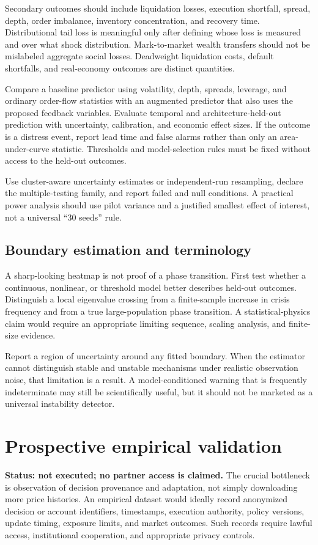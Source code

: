 \documentclass[11pt,a4paper]{article}
\theoremstyle{definition}
\theoremstyle{remark}
\begin{document}
Secondary outcomes should include liquidation losses, execution shortfall, spread, depth, order imbalance, inventory concentration, and recovery time. Distributional tail loss is meaningful only after defining whose loss is measured and over what shock distribution. Mark-to-market wealth transfers should not be mislabeled aggregate social losses. Deadweight liquidation costs, default shortfalls, and real-economy outcomes are distinct quantities.

Compare a baseline predictor using volatility, depth, spreads, leverage, and ordinary order-flow statistics with an augmented predictor that also uses the proposed feedback variables. Evaluate temporal and architecture-held-out prediction with uncertainty, calibration, and economic effect sizes. If the outcome is a distress event, report lead time and false alarms rather than only an area-under-curve statistic. Thresholds and model-selection rules must be fixed without access to the held-out outcomes.

Use cluster-aware uncertainty estimates or independent-run resampling, declare the multiple-testing family, and report failed and null conditions. A practical power analysis should use pilot variance and a justified smallest effect of interest, not a universal ``30 seeds'' rule.

\subsection{Boundary estimation and terminology}
A sharp-looking heatmap is not proof of a phase transition. First test whether a continuous, nonlinear, or threshold model better describes held-out outcomes. Distinguish a local eigenvalue crossing from a finite-sample increase in crisis frequency and from a true large-population phase transition. A statistical-physics claim would require an appropriate limiting sequence, scaling analysis, and finite-size evidence.

Report a region of uncertainty around any fitted boundary. When the estimator cannot distinguish stable and unstable mechanisms under realistic observation noise, that limitation is a result. A model-conditioned warning that is frequently indeterminate may still be scientifically useful, but it should not be marketed as a universal instability detector.

\section{Prospective empirical validation}
\label{sec:empirical}
\textbf{Status: not executed; no partner access is claimed.} The crucial bottleneck is observation of decision provenance and adaptation, not simply downloading more price histories. An empirical dataset would ideally record anonymized decision or account identifiers, timestamps, execution authority, policy versions, update timing, exposure limits, and market outcomes. Such records require lawful access, institutional cooperation, and appropriate privacy controls.
\end{document}
